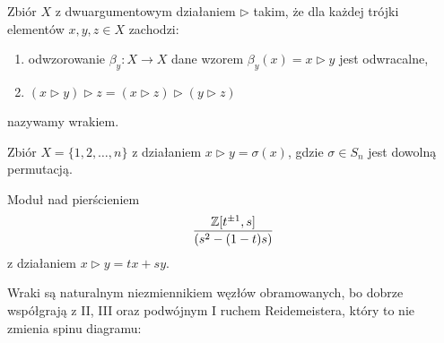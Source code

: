 \begin{definition}[wrak]
%
    Zbiór $X$ z dwuargumentowym działaniem $\triangleright$ takim, że dla każdej trójki elementów $x, y, z \in X$ zachodzi:
    \begin{enumerate}
        \item odwzorowanie $\beta_y \colon X \to X$ dane wzorem $\beta_y(x) = x \triangleright y$ jest odwracalne,
        \item $(x \triangleright y) \triangleright z = (x \triangleright z) \triangleright (y \triangleright z)$
    \end{enumerate}
    nazywamy wrakiem.
\end{definition}

\begin{example}
    Zbiór $X = \{1, 2, \ldots, n\}$ z działaniem $x \triangleright y = \sigma(x)$, gdzie $\sigma \in S_n$ jest dowolną permutacją.
\end{example}

\begin{example}
    Moduł nad pierścieniem
    \begin{equation}
        \frac{\mathbb Z[t^{\pm 1}, s]}{(s^2 - (1-t)s)}
    \end{equation}
    z działaniem $x \triangleright y = tx+sy$.
\end{example}

Wraki są naturalnym niezmiennikiem węzłów obramowanych, bo dobrze współgrają z II, III oraz podwójnym I ruchem Reidemeistera, który to nie zmienia spinu diagramu:
\begin{comment}
\[
    \LargeReidemeisterOneLeftRightQuandleProof
    \cong
    \LargeReidemeisterOneStraightQuandleProofRotated
\]
\end{comment}



